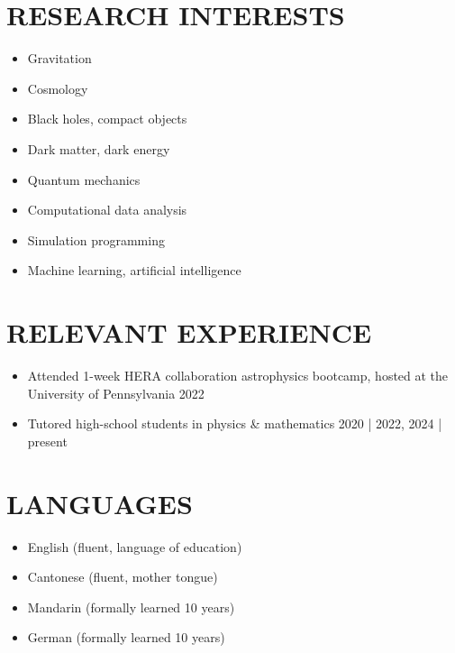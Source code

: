 \documentclass[a4paper,10pt]{extarticle}
\begin{document}
\section*{RESEARCH INTERESTS}
\begin{itemize}
    \item Gravitation

    \item Cosmology

    \item Black holes, compact objects

    \item Dark matter, dark energy

    \item Quantum mechanics

    \item Computational data analysis

    \item Simulation programming

    \item Machine learning, artificial intelligence
\end{itemize}

\section*{RELEVANT EXPERIENCE}
\begin{itemize}
    \item Attended 1-week HERA collaboration astrophysics bootcamp, hosted at the University of Pennsylvania \hfill 2022

    \item Tutored high-school students in physics \& mathematics \hfill 2020 | 2022, 2024 | present
\end{itemize}

\section*{LANGUAGES}
\begin{itemize}
    \item English (fluent, language of education)

    \item Cantonese (fluent, mother tongue)

    \item Mandarin (formally learned 10 years)

    \item German (formally learned 10 years)
\end{itemize}
\end{document}
